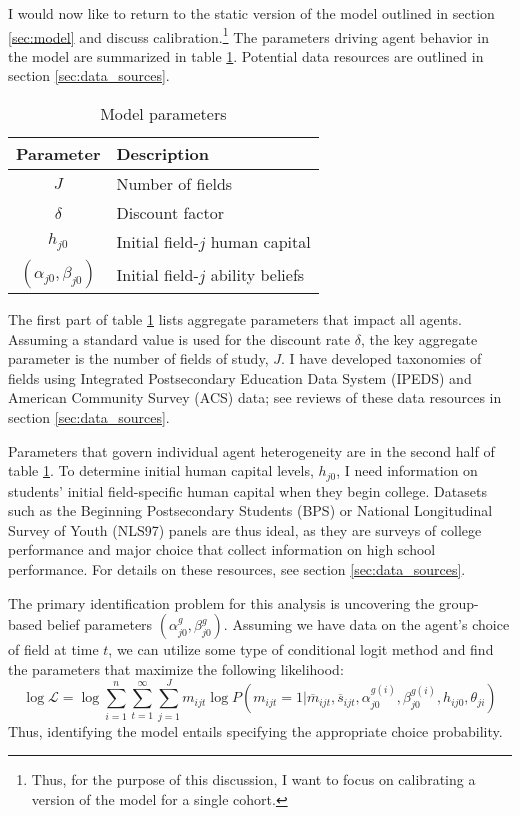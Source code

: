 I would now like to return to the static version of the model outlined in section \ref{sec:model} and discuss calibration.\footnote{
    Thus, for the purpose of this discussion, I want to focus on calibrating a version of the model for a single cohort.
}
The parameters driving agent behavior in the model are summarized in table \ref{tab:parameter_descriptions}.
Potential data resources are outlined in section \ref{sec:data_sources}.
\begin{table}[!ht]
\centering
\caption{Model parameters}{}
\label{tab:parameter_descriptions}
\begin{tabular}{cl}
\hline \hline{}
Parameter & Description %
\\ \hline{}
$J$ & Number of fields %
\\
$\delta$ & Discount factor
\\ \hline
$h_{j0}$ & Initial field-$j$ human capital
\\ 
$(\alpha_{j0}, \beta_{j0})$ & Initial field-$j$ ability beliefs
\\ \hline \hline
\end{tabular}
\end{table}
The first part of table \ref{tab:parameter_descriptions} lists aggregate parameters that impact all agents.
Assuming a standard value is used for the discount rate $\delta$, the key aggregate parameter is the number of fields of study, $J$. 
I have developed taxonomies of fields using Integrated Postsecondary Education Data System (IPEDS) and American Community Survey (ACS) data; see reviews of these data resources in section \ref{sec:data_sources}.

Parameters that govern individual agent heterogeneity are in the second half of table \ref{tab:parameter_descriptions}.
To determine initial human capital levels, $h_{j0}$, I need information on students' initial field-specific human capital when they begin college.
Datasets such as the Beginning Postsecondary Students (BPS) or National Longitudinal Survey of Youth (NLS97) panels are thus ideal, as they are surveys of college performance and major choice that collect information on high school performance. 
For details on these resources, see section \ref{sec:data_sources}. 

The primary identification problem for this analysis is uncovering the group-based belief parameters $(\alpha_{j0}^g, \beta_{j0}^g)$.
Assuming we have data on the agent's choice of field at time $t$, we can utilize some type of conditional logit method and find the parameters that maximize the following likelihood:
\begin{equation*}
    \log \mathcal{L} 
    = 
    \log \sum_{i = 1}^n \sum_{t=1}^\infty \sum_{j=1}^J m_{ijt} 
    \log P(m_{ijt} = 1 \vert \overline{m}_{ijt}, \overline{s}_{ijt}, \alpha_{j0}^{g(i)}, \beta_{j0}^{g(i)}, h_{ij0}, \theta_{ji})
\end{equation*}
Thus, identifying the model entails specifying the appropriate choice probability.


